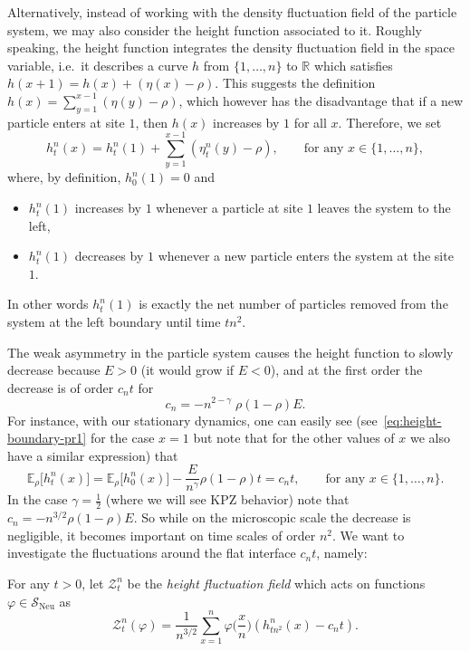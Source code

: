 \documentclass[AHL,Unicode,longabstracts]{cedram}
\DeclareMathOperator{\Neu}{Neu}
\newcommand{\bb}[1]{{\mathbb #1}}
\newcommand{\RR}{\mathbb R}
\newcommand{\mc}[1]{{\mathcal #1}}
\renewcommand{\mc}[1]{{\mathcal #1}}
\newcommand{\SN}{\ensuremath{\mc S_{\Neu}}}
\renewcommand{\tfrac}{\frac}
\begin{document}
Alternatively, instead of working with the density fluctuation field of the particle system, we may also consider the height function associated to it. Roughly speaking, the height function integrates the density fluctuation field in the space variable, i.e.~it describes a curve $h$ from $\{1, \dots, n\}$ to $\RR$ which satisfies $h(x+1) = h(x) + (\eta(x)-\rho)$. This suggests the definition $h(x) = \sum_{y=1}^{x-1} (\eta(y) - \rho)$, which however has the disadvantage that if a new particle enters at site $1$, then $h(x)$ increases by $1$ for all $x$. Therefore, we set
\begin{equation}\label{eq:htn}
h^n_t (x) = h^n_t (1) + \sum_{y = 1}^{x - 1} (\eta^n_{t} (y) - \rho), \qquad \text{for any }x \in \{ 1, \ldots, n \},
\end{equation}
where, by definition, $h_0^n (1) = 0$ and
\begin{itemize}
\item $h_t^n (1)$ increases by $1$ whenever a particle at site $1$ leaves the system to the left,
\item $h_t^n (1)$ decreases by $1$ whenever a new particle enters the system at the site $1$.
\end{itemize}
In other words $h_t^n (1)$ is exactly the net number of particles removed from the system at the left boundary until time $tn^2$.

The weak asymmetry in the particle system causes the height function to slowly decrease because $E>0$ (it would grow if $E<0$), and at the first order the decrease is of order $c_n t$ for
\begin{equation}
c_n = -n^{2 - \gamma} \; \rho (1 - \rho) E. \label{eq:cn}
\end{equation}
For instance, with our stationary dynamics, one can easily see (see~\eqref{eq:height-boundary-pr1} for the case $x=1$ but note that for the other values of $x$ we also have a similar expression) that
\[
\bb E_\rho\big[h_t^n(x)\big] = \bb E_\rho\big[h_0^n(x)\big] - \frac{E}{n^\gamma} \rho(1-\rho)t = c_n t, \qquad \text{for any } x\in\{1,\dots,n\}.
\]
In the case $\gamma = \frac12$ (where we will see KPZ behavior) note that $c_n = - n^{3/2} \rho(1-\rho)E$. So while on the microscopic scale the decrease is negligible, it becomes important on time scales of order $n^2$. We want to investigate the fluctuations around the flat interface $c_n t$, namely:

\begin{defi}
For any $t >0$, let $\mc Z_t^n$ be the \emph{height fluctuation field} which acts on functions $\varphi \in \SN$ as
\[
\mc Z^n_t(\varphi) = \frac{1}{n^{3/2}} \sum_{x = 1}^n \varphi\bigg(\tfrac{x}{n}\bigg) (h^n_{tn^2}(x) - c_n t).
\]
\end{defi}
\end{document}
